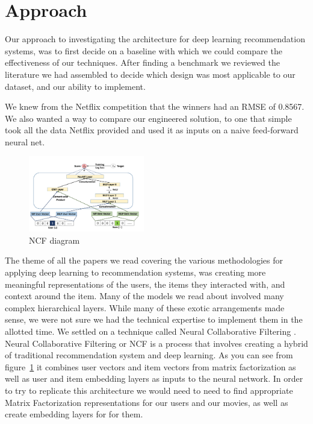 \section{Approach}
Our approach to investigating the architecture for deep learning recommendation systems, was to first decide on a baseline with which we could compare the effectiveness of our techniques. After finding a benchmark we reviewed the literature we had assembled to decide which design was most applicable to our dataset, and our ability to implement.

 We knew from the Netflix competition that the winners had an RMSE of 0.8567. We also wanted a way to compare our engineered solution, to one that simple took all the data Netflix provided and used it as inputs on a naive feed-forward neural net. 

 \begin{figure}[h]
    \centering
    \includegraphics[width=0.45\textwidth]{images/NCF_diagram.png}
    \caption{NCF diagram}
    \label{fig:NCF diagram}
\end{figure}

 The theme of all the papers we read covering the various methodologies for applying deep learning to recommendation systems, was creating more meaningful representations of the users, the items they interacted with, and context around the item. Many of the models we read about involved many complex hierarchical layers. While many of these exotic arrangements made sense, we were not sure we had the technical expertise to implement them in the allotted time. We settled on a technique called Neural Collaborative Filtering \cite{He2017}. Neural Collaborative Filtering or NCF is a process that involves creating a hybrid of traditional recommendation system and deep learning. As you can see from figure~\ref{fig:NCF diagram} it combines user vectors and item vectors from matrix factorization as well as user and item embedding layers as inputs to the neural network. In order to try to replicate this architecture we would need to need to find appropriate Matrix Factorization representations for our users and our movies, as well as create embedding layers for for them.


